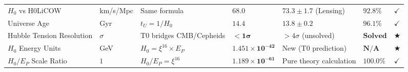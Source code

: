\documentclass[12pt,a4paper]{article}
\newcommand{\checked}{\checkmark}
\begin{document}
\begin{landscape}
\begin{longtable}{p{5.8cm}p{2cm}p{4.2cm}p{3.8cm}p{3.8cm}p{2.0cm}p{1cm}}
			$H_0$ vs H0LiCOW & km/s/Mpc & Same formula & $\mathbf{68.0}$ & $73.3 \pm 1.7$ (Lensing) & $\mathbf{92.8\%}$ & $\checked$ \\
			
			Universe Age & Gyr & $t_U = 1/H_0$ & $\mathbf{14.4}$ & $13.8 \pm 0.2$ & $\mathbf{96.1\%}$ & $\checked$ \\
			
			Hubble Tension Resolution & $\sigma$ & T0 bridges CMB/Cepheids & $\mathbf{<1\sigma}$ & $>4\sigma$ (unsolved) & $\mathbf{Solved}$ & $\bigstar$ \\
			
			$H_0$ Energy Units & GeV & $H_0 = \xi^{16} \times E_P$ & $\mathbf{1.451 \times 10^{-42}}$ & New (T0 prediction) & $\mathbf{N/A}$ & $\bigstar$ \\
			
			$H_0/E_P$ Scale Ratio & $1$ & $H_0/E_P = \xi^{16}$ & $\mathbf{1.189 \times 10^{-61}}$ & Pure theory calculation & $\mathbf{100.0\%}$ & $\checked$ \\
		\end{longtable}
		\normalsize
	\end{landscape}
\end{document}
